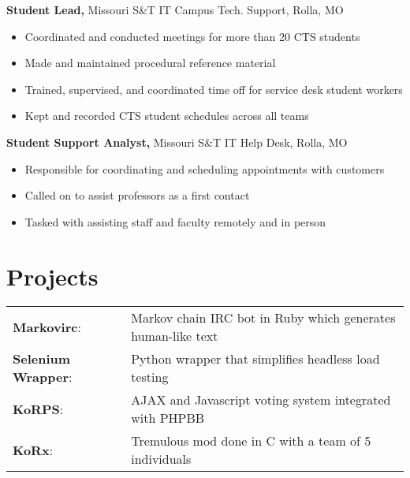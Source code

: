 \documentclass[margin]{res}
\newcommand{\github}[0]%
{%
  \hspace{-4mm}\faGithubSign\hspace{1mm}%
}
\begin{document}
\begin{resume}
     {\bf Student Lead,}  Missouri S\&T IT Campus Tech. Support, Rolla, MO%
       \begin{itemize} \itemsep -1pt  %
         \item Coordinated and conducted meetings for more than 20 CTS students
         \item Made and maintained procedural reference material
         \item Trained, supervised, and coordinated time off for service desk student workers
         \item Kept and recorded CTS student schedules across all teams
       \end{itemize}
     
     {\bf Student Support Analyst,} Missouri S\&T IT Help Desk, Rolla, MO%
       \begin{itemize} \itemsep -1pt  %
         \item Responsible for coordinating and scheduling appointments with customers
         \item Called on to assist professors as a first contact
         \item Tasked with assisting staff and faculty remotely and in person
       \end{itemize}

    \section{Projects} 
      \begin{tabular}{l p{4in}}
        \github\textbf{Markovirc}:            & Markov chain IRC bot in Ruby which generates human-like text \\ [1pt]
        \github\textbf{Selenium Wrapper}:     & Python wrapper that simplifies headless load testing \\ [1pt]
        \textbf{KoRPS}:                       & AJAX and Javascript voting system integrated with PHPBB \\ [1pt]
        \textbf{KoRx}:                        & Tremulous mod done in C with a team of 5 individuals \\ [1pt]
      \end{tabular}


\end{resume}
\end{document}
